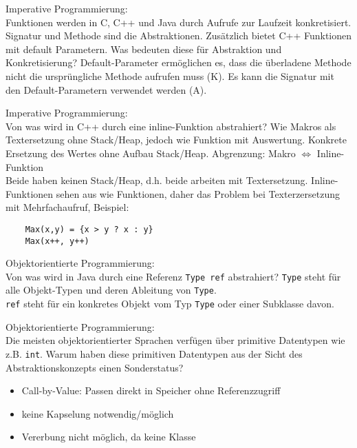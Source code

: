 \begin{card}
	Imperative Programmierung:\\
	Funktionen werden in C, C++ und Java durch Aufrufe zur Laufzeit konkretisiert. Signatur und Methode sind die Abstraktionen. Zusätzlich bietet C++ Funktionen mit default Parametern. Was bedeuten diese für Abstraktion und Konkretisierung?
	\hr
  Default-Parameter ermöglichen es, dass die überladene Methode nicht die ursprüngliche Methode aufrufen muss (K). Es kann die Signatur mit den Default-Parametern verwendet werden (A).
\end{card}

\begin{card}
	Imperative Programmierung:\\
	Von was wird in C++ durch eine inline-Funktion abstrahiert?
	\hr
	Wie Makros als Textersetzung ohne Stack/Heap, jedoch wie Funktion mit Auswertung.
	Konkrete Ersetzung des Wertes ohne Aufbau Stack/Heap.
	\vfill
	Abgrenzung: Makro $\Leftrightarrow$ Inline-Funktion\\
	Beide haben keinen Stack/Heap, d.h. beide arbeiten mit Textersetzung. Inline-Funktionen sehen aus wie Funktionen, daher das Problem bei Texterzersetzung mit Mehrfachaufruf, Beispiel:
	\begin{lstlisting}
	Max(x,y) = {x > y ? x : y}
	Max(x++, y++)
	\end{lstlisting}
\end{card}

\begin{card}
	Objektorientierte Programmierung:\\
	Von was wird in Java durch eine Referenz \texttt{Type ref} abstrahiert?
	\hr
  \texttt{Type} steht für alle Objekt-Typen und deren Ableitung von \texttt{Type}.\\
	\texttt{ref} steht für ein konkretes Objekt vom Typ \texttt{Type} oder einer Subklasse davon.
\end{card}

\begin{card}
	Objektorientierte Programmierung:\\
	Die meisten objektorientierter Sprachen verfügen über primitive Datentypen wie z.B. \texttt{int}. Warum haben diese primitiven Datentypen aus der Sicht des Abstraktionskonzepts einen Sonderstatus?
	\hr
	\begin{itemize}
	\item Call-by-Value: Passen direkt in Speicher ohne Referenzzugriff
	\item keine Kapselung notwendig/möglich
	\item Vererbung nicht möglich, da keine Klasse
	\end{itemize}
\end{card}

